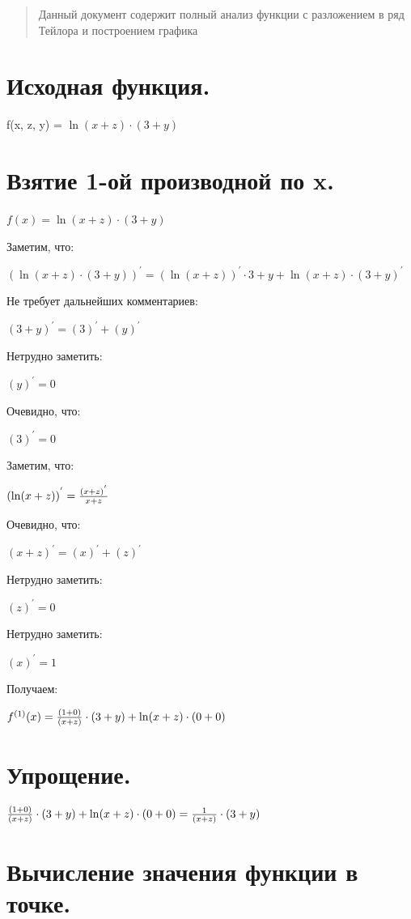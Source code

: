 \documentclass{article}
\begin{document}
\renewcommand{\abstractname}{Полный анализ функции}\begin{abstract}Данный документ содержит полный анализ функции с разложением в ряд Тейлора и построением графика\end{abstract}
\section{Исходная функция.}

f(x, z, y) = $\ln(x + z) \cdot (3 + y)$

\section{Взятие 1-ой производной по x.}

$ f(x) = \ln(x + z) \cdot (3 + y)$

Заметим, что:

${(\ln(x + z) \cdot (3 + y))}^{'} = {(\ln(x + z))}^{'}\cdot 3 + y + \ln(x + z)\cdot {(3 + y)}^{'}$

Не требует дальнейших комментариев:

${(3 + y)}^{'} = {(3)}^{'} + {(y)}^{'}$

Нетрудно заметить:

${(y)}^{'} = 0$

Очевидно, что:

${(3)}^{'} = 0$

Заметим, что:

${(\ln(x + z))}^{'} = {{{(x + z)}^{'} } \over {x + z}}$

Очевидно, что:

${(x + z)}^{'} = {(x)}^{'} + {(z)}^{'}$

Нетрудно заметить:

${(z)}^{'} = 0$

Нетрудно заметить:

${(x)}^{'} = 1$

Получаем:

$ f^{(1)}(x) = {(1 + 0) \over (x + z)} \cdot (3 + y) + \ln(x + z) \cdot (0 + 0)$

\section{Упрощение.}

${(1 + 0) \over (x + z)} \cdot (3 + y) + \ln(x + z) \cdot (0 + 0) = {1 \over (x + z)} \cdot (3 + y)$
\section{Вычисление значения функции в точке.}
\end{document}
